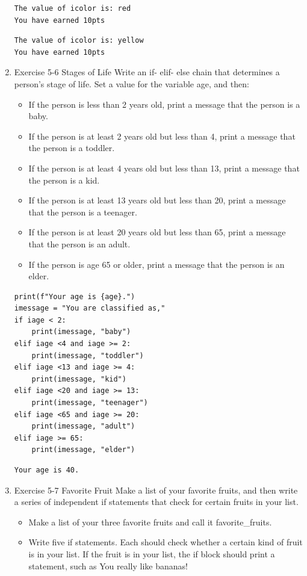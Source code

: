 \documentclass[10pt]{book}
\begin{document}
\begin{enumerate}
\label{orge5c69c9}
\begin{verbatim}
The value of icolor is: red
You have earned 10pts
\end{verbatim}

\label{org6f8f352}
\begin{verbatim}
The value of icolor is: yellow
You have earned 10pts
\end{verbatim}
\item Exercise 5-6 Stages of Life
\label{sec:org40a8b39}
Write an if- elif- else chain that determines a person’s stage of life. Set a value for the variable age, and then: 
\begin{itemize}
\item If the person is less than 2 years old, print a message that the person is a baby.
\item If the person is at least 2 years old but less than 4, print a message that the person is a toddler.
\item If the person is at least 4 years old but less than 13, print a message that the person is a kid.
\item If the person is at least 13 years old but less than 20, print a message that the person is a teenager.
\item If the person is at least 20 years old but less than 65, print a message that the person is an adult.
\item If the person is age 65 or older, print a message that the person is an elder.
\end{itemize}

\begin{verbatim}
print(f"Your age is {age}.")
imessage = "You are classified as,"
if iage < 2:
    print(imessage, "baby")
elif iage <4 and iage >= 2:
    print(imessage, "toddler")
elif iage <13 and iage >= 4:
    print(imessage, "kid")
elif iage <20 and iage >= 13:
    print(imessage, "teenager")
elif iage <65 and iage >= 20:
    print(imessage, "adult")
elif iage >= 65:
    print(imessage, "elder")
\end{verbatim}

\label{org8005252}
\begin{verbatim}
Your age is 40.
\end{verbatim}
\item Exercise 5-7 Favorite Fruit
\label{sec:orgf1cf9fe}
Make a list of your favorite fruits, and then write a series of independent if statements that check for certain fruits in your list. 
\begin{itemize}
\item Make a list of your three favorite fruits and call it favorite\_fruits.
\item Write five if statements. Each should check whether a certain kind of fruit is in your list. If the fruit is in your list, the if block should print a statement, such as You really like bananas!
\end{itemize}


\end{enumerate}
\end{document}
